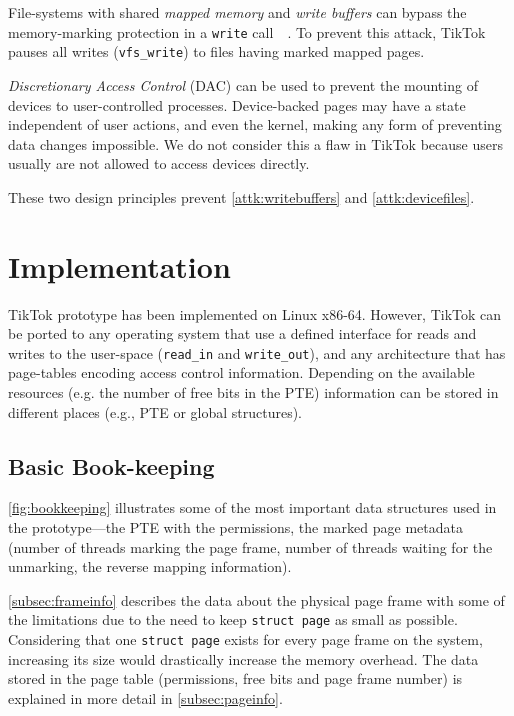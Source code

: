 \documentclass[conference]{IEEEtran}
\newcommand{\sysname}{TikTok}
\begin{document}
File-systems with shared
\emph{mapped memory} and \emph{write buffers} can bypass the memory-marking
protection in a \texttt{write} call~~\cite{watson2007exploiting}. To prevent
this attack, \sysname{} pauses
all writes (\texttt{vfs\_write}) to files having marked mapped pages.

\emph{Discretionary Access Control} (DAC) can be used to prevent the mounting of
devices to user-controlled processes. Device-backed pages may have a state
independent of user actions, and even the kernel, making any form of preventing
data changes impossible. We do not consider this a flaw in \sysname{} because
users usually are not allowed to access devices directly.

These two design principles prevent \autoref{attk:writebuffers} and
\autoref{attk:devicefiles}.


\section{Implementation} \label{sec:implementation}

\sysname{} prototype has been implemented on Linux x86-64. However, \sysname{}
can be ported to any operating system that use a defined interface for reads and
writes to the user-space (\texttt{read\_in} and \texttt{write\_out}), and any
architecture that has page-tables encoding access control information. Depending
on the available resources (e.g. the number of free bits in the PTE) information
can be stored in different places (e.g., PTE or global structures).

\subsection{Basic Book-keeping}
\autoref{fig:bookkeeping} illustrates some of the most important data structures
used in the prototype---the PTE with the permissions, the marked page metadata
(number of threads marking the page frame, number of threads waiting for the
unmarking, the reverse mapping information). 

\autoref{subsec:frameinfo} describes the data about the physical page frame with
some of the limitations due to the need to keep \texttt{struct page} as small as
possible. Considering that one \texttt{struct page} exists for every page frame
on the system, increasing its size would drastically increase the memory
overhead.  The data stored in the page table (permissions, free bits and page
frame number) is explained in more detail in \autoref{subsec:pageinfo}.
\end{document}
